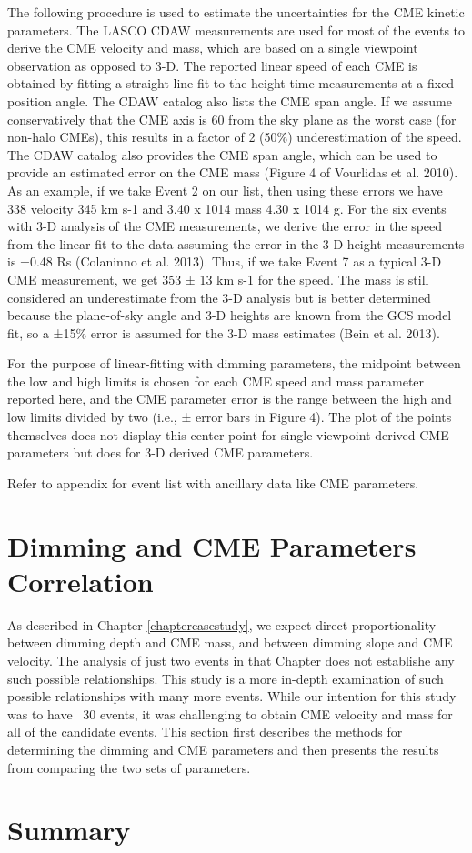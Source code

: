 The following procedure is used to estimate the uncertainties for the CME kinetic parameters. The LASCO CDAW measurements are used for most of the events to derive the CME velocity and mass, which are based on a single viewpoint observation as opposed to 3-D. The reported linear speed of each CME is obtained by fitting a straight line fit to the height-time measurements at a fixed position angle. The CDAW catalog also lists the CME span angle. If we assume conservatively that the CME axis is 60 from the sky plane as the worst case (for non-halo CMEs), this results in a factor of 2 (50\%) underestimation of the speed. The CDAW catalog also provides the CME span angle, which can be used to provide an estimated error on the CME mass (Figure 4 of Vourlidas et al. 2010). As an example, if we take Event 2 on our list, then using these errors we have 338  velocity  345 km s-1 and 3.40 x 1014  mass  4.30 x 1014 g. 
For the six events with 3-D analysis of the CME measurements, we derive the error in the speed from the linear fit to the data assuming the error in the 3-D height measurements is ±0.48 Rs (Colaninno et al. 2013). Thus, if we take Event 7 as a typical 3-D CME measurement, we get 353 ± 13 km s-1 for the speed. The mass is still considered an underestimate from the 3-D analysis but is better determined because the plane-of-sky angle and 3-D heights are known from the GCS model fit, so a ±15\% error is assumed for the 3-D mass estimates (Bein et al. 2013).

For the purpose of linear-fitting with dimming parameters, the midpoint between the low and high limits is chosen for each CME speed and mass parameter reported here, and the CME parameter error is the range between the high and low limits divided by two (i.e., ± error bars in Figure 4). The plot of the points themselves does not display this center-point for single-viewpoint derived CME parameters but does for 3-D derived CME parameters. 

Refer to appendix for event list with ancillary data like CME parameters. 

\section{Dimming and CME Parameters Correlation}
\label{sec:correlation}
As described in Chapter \ref{chaptercasestudy}, we expect direct proportionality between dimming depth and CME mass, and between dimming slope and CME velocity. The analysis of just two events in that Chapter does not establishe any such possible relationships. This study is a more in-depth examination of such possible relationships with many more events. While our intention for this study was to have ~30 events, it was challenging to obtain CME velocity and mass for all of the candidate events. This section first describes the methods for determining the dimming and CME parameters and then presents the results from comparing the two sets of parameters. 

\section{Summary} 
\label{sec:chapter5summary}









